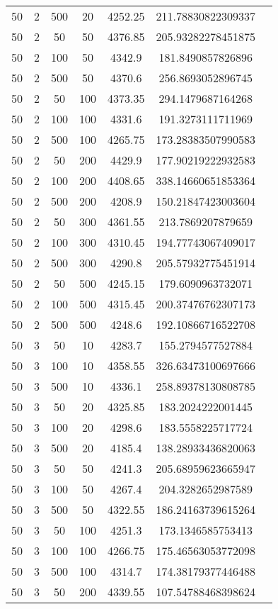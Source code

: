 {\begin{longtabu}{S
S
S
S
S
S[round-mode=places,round-precision=0]
S[round-mode=places,round-precision=0]}
50 & 2 & 500 & 20 & 4252.25 & 211.78830822309337 \\
50 & 2 & 50 & 50 & 4376.85 & 205.93282278451875 \\
50 & 2 & 100 & 50 & 4342.9 & 181.8490857826896 \\
50 & 2 & 500 & 50 & 4370.6 & 256.8693052896745 \\
50 & 2 & 50 & 100 & 4373.35 & 294.1479687164268 \\
50 & 2 & 100 & 100 & 4331.6 & 191.3273111711969 \\
50 & 2 & 500 & 100 & 4265.75 & 173.28383507990583 \\
50 & 2 & 50 & 200 & 4429.9 & 177.90219222932583 \\
50 & 2 & 100 & 200 & 4408.65 & 338.14660651853364 \\
50 & 2 & 500 & 200 & 4208.9 & 150.21847423003604 \\
50 & 2 & 50 & 300 & 4361.55 & 213.7869207879659 \\
50 & 2 & 100 & 300 & 4310.45 & 194.77743067409017 \\
50 & 2 & 500 & 300 & 4290.8 & 205.57932775451914 \\
50 & 2 & 50 & 500 & 4245.15 & 179.6090963732071 \\
50 & 2 & 100 & 500 & 4315.45 & 200.37476762307173 \\
50 & 2 & 500 & 500 & 4248.6 & 192.10866716522708 \\
50 & 3 & 50 & 10 & 4283.7 & 155.2794577527884 \\
50 & 3 & 100 & 10 & 4358.55 & 326.63473100697666 \\
50 & 3 & 500 & 10 & 4336.1 & 258.89378130808785 \\
50 & 3 & 50 & 20 & 4325.85 & 183.2024222001445 \\
50 & 3 & 100 & 20 & 4298.6 & 183.5558225717724 \\
50 & 3 & 500 & 20 & 4185.4 & 138.28933436820063 \\
50 & 3 & 50 & 50 & 4241.3 & 205.68959623665947 \\
50 & 3 & 100 & 50 & 4267.4 & 204.3282652987589 \\
50 & 3 & 500 & 50 & 4322.55 & 186.24163739615264 \\
50 & 3 & 50 & 100 & 4251.3 & 173.1346585753413 \\
50 & 3 & 100 & 100 & 4266.75 & 175.46563053772098 \\
50 & 3 & 500 & 100 & 4314.7 & 174.38179377446488 \\
50 & 3 & 50 & 200 & 4339.55 & 107.54788468398624 \\

\end{longtabu}}

